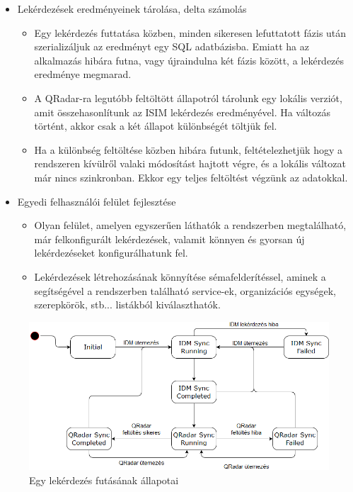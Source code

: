 \begin{itemize}
	\item Lekérdezések eredményeinek tárolása, delta számolás
	\begin{itemize}
		\item Egy lekérdezés futtatása közben, minden sikeresen lefuttatott fázis után szerializáljuk az eredményt egy SQL adatbázisba. Emiatt ha az alkalmazás hibára futna, vagy újraindulna két fázis között, a lekérdezés eredménye megmarad.
		\item A QRadar-ra legutóbb feltöltött állapotról tárolunk egy lokális verziót, amit összehasonlítunk az ISIM lekérdezés eredményével. Ha változás történt, akkor csak a két állapot különbségét töltjük fel.
		\item Ha a különbség feltöltése közben hibára futunk, feltételezhetjük hogy a rendszeren kívülről valaki módosítást hajtott végre, és a lokális változat már nincs szinkronban. Ekkor egy teljes feltöltést végzünk az adatokkal.
	\end{itemize}

	\item Egyedi felhasználói felület fejlesztése
	\begin{itemize}
		\item Olyan felület, amelyen egyszerűen láthatók a rendszerben megtalálható, már felkonfigurált lekérdezések, valamit könnyen és gyorsan új lekérdezéseket konfigurálhatunk fel.
		\item Lekérdezések létrehozásának könnyítése sémafelderítéssel, aminek a segítségével a rendszerben található service-ek, organizációs egységek, szerepkörök, stb... listákból kiválaszthatók.
	\end{itemize}
\end{itemize}

\begin{figure}
	\centering
	\includegraphics[width=0.9\linewidth]{figures/refloader_states}
	\caption{Egy lekérdezés futásának állapotai}
	\label{fig:refloaderstates}
\end{figure}


